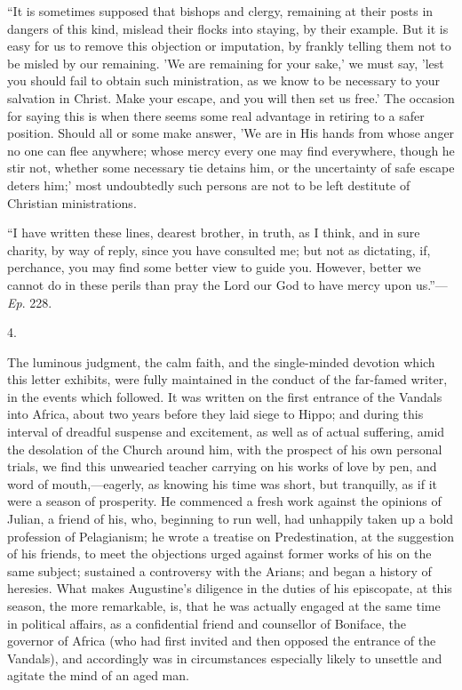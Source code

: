 ``It is sometimes supposed that bishops and clergy, remaining
at their posts in dangers of this kind, mislead their flocks into
staying, by their example. But it is easy for us to remove this
objection or imputation, by frankly telling them
not to be misled by our remaining. 'We are remaining for your sake,'
we must say, 'lest you should fail to obtain such ministration, as we
know to be necessary to your salvation in Christ. Make your escape,
and you will then set us free.' The occasion for saying this is when
there seems some real advantage in retiring to a safer position.
Should all or some make answer, 'We are in His hands from whose anger
no one can flee anywhere; whose mercy every one may find everywhere,
though he stir not, whether some necessary tie detains him, or the
uncertainty of safe escape deters him;' most undoubtedly such persons
are not to be left destitute of Christian ministrations.

``I have written these lines, dearest brother, in truth, as I
think, and in sure charity, by way of reply, since you have consulted
me; but not as dictating, if, perchance, you may find some better view
to guide you. However, better we cannot do in these perils than pray
the Lord our God to have mercy upon us.''—\emph{Ep}. 228.

4.

The luminous judgment, the calm faith, and the single-minded
devotion which this letter exhibits, were fully maintained in the
conduct of the far-famed writer, in the events which followed. It was
written on the first entrance of the Vandals into Africa, about two
years before they laid siege to Hippo; and during this interval of
dreadful suspense and excitement, as well as of actual suffering, amid
the desolation of the Church around him, with the prospect of his own
personal trials, we find this unwearied teacher carrying on his works
of love by pen, and word of mouth,—eagerly, as knowing his time was
short, but tranquilly, as if it were a season of prosperity. He
commenced a fresh work against the opinions of Julian, a friend of
his, who, beginning to run well, had unhappily taken up a bold
profession of Pelagianism; he wrote a treatise on Predestination, at
the suggestion of his friends, to meet the objections urged against
former works of his on the same subject; sustained a controversy with
the Arians; and began a history of heresies. What makes
Augustine's diligence in the duties of his episcopate, at this season,
the more remarkable, is, that he was actually engaged at the same time
in political affairs, as a confidential friend and counsellor of
Boniface, the governor of Africa (who had first invited and then
opposed the entrance of the Vandals), and accordingly was in
circumstances especially likely to unsettle and agitate the mind of an
aged man.

